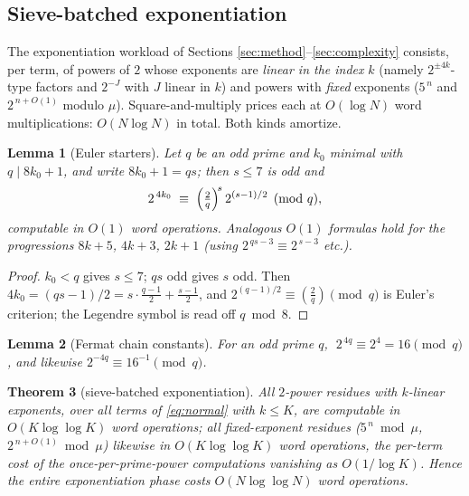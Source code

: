 \documentclass[11pt]{article}
\newtheorem{theorem}{Theorem}
\newtheorem{lemma}[theorem]{Lemma}
\theoremstyle{remark}
\theoremstyle{definition}
\begin{document}
\subsection{Sieve-batched exponentiation}\label{sec:sieve}

The exponentiation workload of Sections \ref{sec:method}--\ref{sec:complexity}
consists, per term, of powers of $2$ whose exponents are \emph{linear in the
index} $k$ (namely $2^{\pm4k}$-type factors and $2^{-J}$ with $J$ linear in
$k$) and powers with \emph{fixed} exponents ($5^{\,n}$ and $2^{\,n+O(1)}$
modulo $\mu$). Square-and-multiply prices each at $O(\log N)$ word
multiplications: $O(N\log N)$ in total. Both kinds amortize.

\begin{lemma}[Euler starters]\label{lem:euler}
Let $q$ be an odd prime and $k_0$ minimal with $q\mid 8k_0+1$, and write
$8k_0+1=qs$; then $s\le 7$ is odd and
\[
2^{\,4k_0}\;\equiv\;\Bigl(\tfrac{2}{q}\Bigr)^{\!s}\,2^{(s-1)/2}
\pmod q ,
\]
computable in $O(1)$ word operations. Analogous $O(1)$ formulas hold for
the progressions $8k+5$, $4k+3$, $2k+1$ (using
$2^{\,qs-3}\equiv2^{\,s-3}$ etc.).
\end{lemma}

\begin{proof}
$k_0<q$ gives $s\le 7$; $qs$ odd gives $s$ odd. Then
$4k_0=(qs-1)/2=s\cdot\frac{q-1}{2}+\frac{s-1}{2}$, and
$2^{(q-1)/2}\equiv(\frac{2}{q})\pmod q$ is Euler's criterion; the
Legendre symbol is read off $q\bmod 8$.
\end{proof}

\begin{lemma}[Fermat chain constants]\label{lem:fermat}
For an odd prime $q$, $\;2^{\,4q}\equiv 2^{4}=16\pmod q$, and likewise
$2^{-4q}\equiv 16^{-1}\pmod q$.
\end{lemma}

\begin{theorem}[sieve-batched exponentiation]\label{thm:sieve}
All $2$-power residues with $k$-linear exponents, over all terms of
\eqref{eq:normal} with $k\le K$, are computable in
$O(K\log\log K)$ word operations; all fixed-exponent residues
($5^{\,n}\bmod\mu$, $2^{\,n+O(1)}\bmod\mu$) likewise in
$O(K\log\log K)$ word operations, the per-term cost of the
once-per-prime-power computations vanishing as $O(1/\log K)$. Hence the
entire exponentiation phase costs $O(N\log\log N)$ word operations.
\end{theorem}
\end{document}
